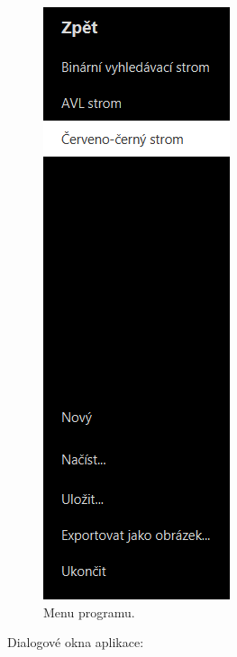 \documentclass[
  biblatex=false,
  font=serif,
  glossaries=false,
  tables=false,
  theorems=false,
  index
]{kidiplom}
\begin{document}
\begin{figure}[h!]
\centering
	\includegraphics[scale=1]{obrazky/35Menu.png}
	\caption{Menu programu.}
	\label{menu}
\end{figure}

\newpage \noindent Dialogové okna aplikace:
%
%
%
%
\end{document}
